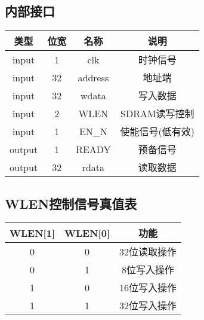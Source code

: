 \subsection{内部接口}
\begin{tabular}{|c|c|c|c|}
    \hline
    类型        &   位宽    &   名称    &   说明\\\hline
    input       &   1      &    clk     &   时钟信号\\\hline
    input       &   32     &    address &   地址端\\\hline
    input       &   32      &   wdata   &   写入数据\\\hline
    input       &   2       &   WLEN    &   SDRAM读写控制\\\hline
    input       &   1       &   EN\_N   &   使能信号(低有效)\\\hline
    output      &   1       &   READY   &   预备信号\\\hline
    output      &   32      &   rdata   &   读取数据\\\hline
\end{tabular}
\subsection{WLEN控制信号真值表}
\begin{tabular}{|c|c|c|}
    \hline
    WLEN[1]  &  WLEN[0] &       功能\\\hline
    0       &   0       &       32位读取操作\\\hline
    0       &   1       &       8位写入操作\\\hline
    1       &   0       &       16位写入操作\\\hline
    1       &   1       &       32位写入操作\\\hline
\end{tabular}
